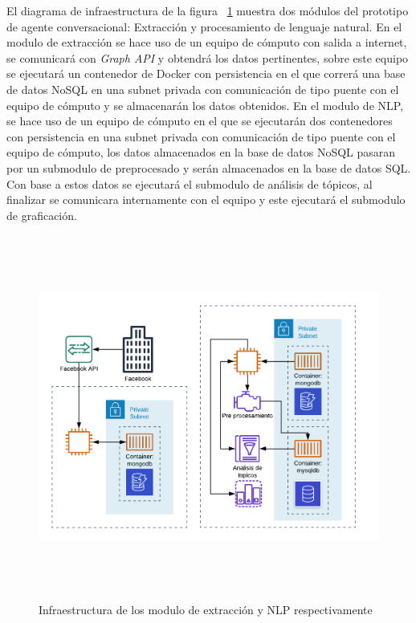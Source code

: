         El diagrama de infraestructura de la figura  ~\ref{fig:infraestructuraExtraccionNLP} muestra dos módulos del prototipo de agente conversacional: Extracción y procesamiento de lenguaje natural.
        En el modulo de extracción se hace uso de un equipo de cómputo con salida a internet, se comunicará con \textit{Graph API} y obtendrá los datos pertinentes, sobre este equipo se ejecutará un contenedor de Docker con persistencia en el que correrá una base de datos NoSQL en una subnet privada con comunicación de tipo puente con el equipo de cómputo y se almacenarán los datos obtenidos.
        En el modulo de NLP, se hace uso de un equipo de cómputo en el que se ejecutarán dos contenedores con persistencia en una subnet privada con comunicación de tipo puente con el equipo de cómputo, los datos almacenados en la base de datos NoSQL pasaran por un submodulo de preprocesado y serán almacenados en la base de datos SQL. Con base a estos datos se ejecutará el submodulo de análisis de tópicos, al finalizar se comunicara internamente con el equipo y este ejecutará el submodulo de graficación.
        \begin{figure}[H]
             \centering
             \includegraphics[height=12cm, width=16.5cm]{Latex/Classes/Imagenes/Diagramas_de_modulos.png}
             \caption{Infraestructura de los modulo de extracción y NLP respectivamente}
              \label{fig:infraestructuraExtraccionNLP}

        \end{figure}
